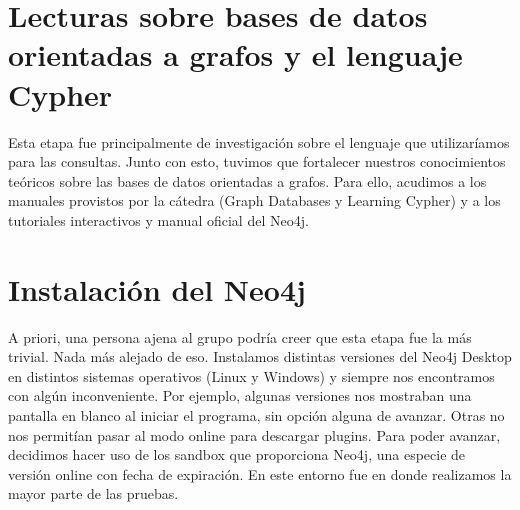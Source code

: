 \documentclass[a4paper,11pt]{article}
\begin{document}
\section{Lecturas sobre bases de datos orientadas a grafos y el lenguaje Cypher}
Esta etapa fue principalmente de investigación sobre el lenguaje que utilizaríamos para las consultas. Junto con esto, tuvimos que fortalecer nuestros conocimientos teóricos sobre las bases de datos orientadas a grafos.
Para ello, acudimos a los manuales provistos por la cátedra (Graph Databases y Learning Cypher) y a los tutoriales interactivos y manual oficial del Neo4j.

\section{Instalación del Neo4j}
A priori, una persona ajena al grupo podría creer que esta etapa fue la más trivial. Nada más alejado de eso.
Instalamos distintas versiones del Neo4j Desktop en distintos sistemas operativos (Linux y Windows) y siempre nos encontramos con algún inconveniente. Por ejemplo, algunas versiones nos mostraban una pantalla en blanco al iniciar el programa, sin opción alguna de avanzar. Otras no nos permitían pasar al modo online para descargar plugins.
Para poder avanzar, decidimos hacer uso de los sandbox que proporciona Neo4j, una especie de versión online con fecha de expiración. En este entorno fue en donde realizamos la mayor parte de las pruebas.
\end{document}
